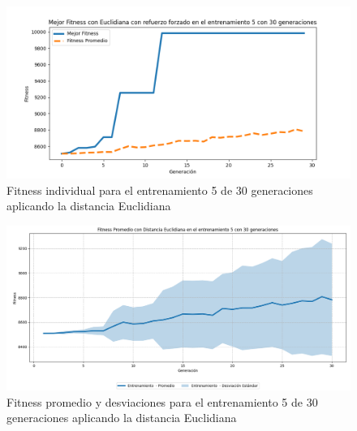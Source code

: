 \documentclass[conference]{IEEEtran}
\begin{document}
\begin{figure}[H]
    \centering
    \includegraphics[width=0.9 \linewidth]{Euclidiana/Fitness_individual_30/Fitness_5_Eucli_30Gen.png}
    \caption{Fitness individual para el entrenamiento 5 de 30 generaciones aplicando la distancia Euclidiana}
    \label{fig:eucli_5_30}
\end{figure}
\begin{figure}[H]
    \centering
    \includegraphics[width=0.9 \linewidth]{Euclidiana/Fitness_individual_30/Fitness_5_Eucli_30Gen_Sombra.png}
    \caption{Fitness promedio y desviaciones para el entrenamiento 5 de 30 generaciones aplicando la distancia Euclidiana}
    \label{fig:eucli_5_30_sombra}
\end{figure}
\end{document}
